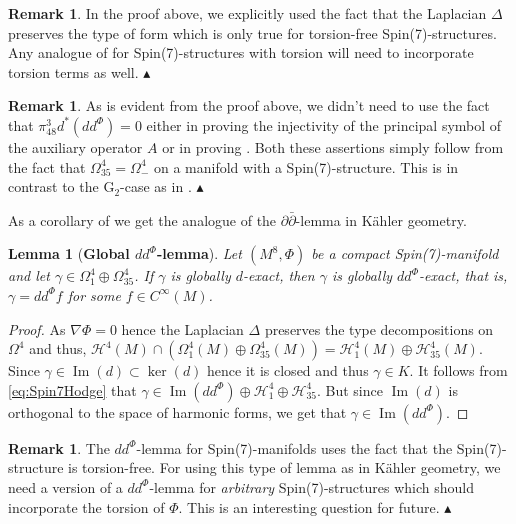 \documentclass[10pt,a4paper,reqno]{article}
\newtheorem{lemma}[theorem]{Lemma}
\theoremstyle{definition}
\newtheorem{remark}[theorem]{Remark}
\numberwithin{equation}{section}
\def\pt{\partial}
\def\del{\nabla}
\def\G2{\mathrm{G}_2}
\def\ddphi{dd^{\Phi}}
\def\cH{\mathcal{H}}
\DeclareMathOperator{\Ima}{Im}
\newcommand\xqed[1]{%
	\leavevmode\unskip\penalty9999 \hbox{}\nobreak\hfill
	\quad\hbox{#1}}
\newcommand\demo{\xqed{$\blacktriangle$}}
\begin{document}
\begin{remark}
In the proof above, we explicitly used the fact that the Laplacian $\Delta$ preserves the type of form which is only true for torsion-free Spin(7)-structures. Any analogue of  for Spin(7)-structures with torsion will need to incorporate torsion terms as well. \demo    
\end{remark}

\begin{remark}\label{rem:differentK}
As is evident from the proof above, we didn't need to use the fact that $\pi^3_{48}d^*(\ddphi)=0$ either in proving the injectivity of the principal symbol of the auxiliary operator $A$ or in proving . Both these assertions simply follow from the fact that $\Omega^4_{35}=\Omega^4_-$ on a manifold with a Spin(7)-structure. This is in contrast to the $\G2$-case as in \cite[Thm. 512]{pacini-raferro-pluripotential}. \demo
\end{remark}

As a corollary of  we get the analogue of the $\pt\bar{\pt}$-lemma in K\"ahler geometry.

\begin{lemma}[\textbf{Global $\ddphi$-lemma}]\label{lem:Spin7delbarlemma}
Let $(M^8, \Phi)$ be a compact Spin(7)-manifold and let $\gamma \in \Omega^4_1\oplus \Omega^4_{35}$. If $\gamma$ is globally $d$-exact, then $\gamma$ is globally $\ddphi$-exact, that is, $\gamma=\ddphi f$ for some $f\in C^{\infty}(M)$. 
\end{lemma}

\begin{proof}
As $\del \Phi=0$ hence the Laplacian $\Delta$ preserves the type decompositions on $\Omega^4$ and thus, $\cH^4(M)\cap (\Omega^4_1(M)\oplus \Omega^4_{35}(M))=\cH^4_1(M)\oplus \cH^4_{35}(M)$. Since $\gamma \in \Ima(d)\subset \ker(d)$ hence it is closed and thus $\gamma \in K$. It follows from \cref{eq:Spin7Hodge} that $\gamma \in \Ima(\ddphi) \oplus \cH^4_1\oplus \cH^4_{35}$. But since $\Ima(d)$ is orthogonal to the space of harmonic forms, we get that $\gamma \in \Ima(\ddphi)$.
\end{proof}


\begin{remark}
The $\ddphi$-lemma for Spin(7)-manifolds uses the fact that the Spin(7)-structure is torsion-free. For using this type of lemma as in K\"ahler geometry, we need a version of a $\ddphi$-lemma for \emph{arbitrary} Spin(7)-structures which should incorporate the torsion of $\Phi$. This is an interesting question for future. \demo
\end{remark}
\end{document}
